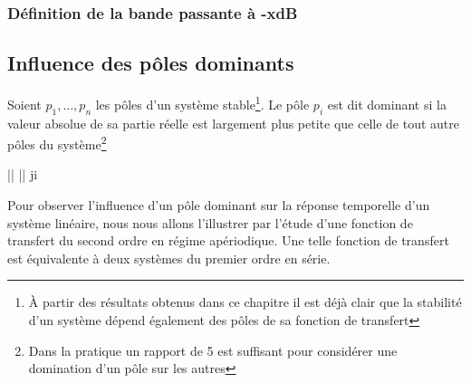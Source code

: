 \subsubsection{Définition de la bande passante à -x\si{\dB}}
\acpl
\subsection{Influence des pôles dominants}
Soient $p_1,\ldots,p_n$ les pôles d'un système stable\footnote{À partir 
des résultats obtenus dans ce chapitre il est déjà clair que la stabilité
d'un système dépend également des pôles de sa fonction de transfert}.
Le pôle $p_i$ est dit dominant si la valeur absolue
de sa partie réelle est largement plus petite que celle de tout autre pôles 
du système\footnote{Dans la pratique un rapport de 5 est 
suffisant pour considérer une domination d'un pôle sur les autres}
\begin{bequation}
    \big|\big| \ll \big|\big|\;\; \forall j\neq i
\end{bequation}
Pour observer l'influence d'un pôle dominant sur 
la réponse temporelle d'un système linéaire, nous
nous allons l'illustrer par l'étude d'une fonction 
de transfert du second ordre en régime apériodique.
Une telle fonction de transfert est équivalente à deux
systèmes du premier ordre en série.

